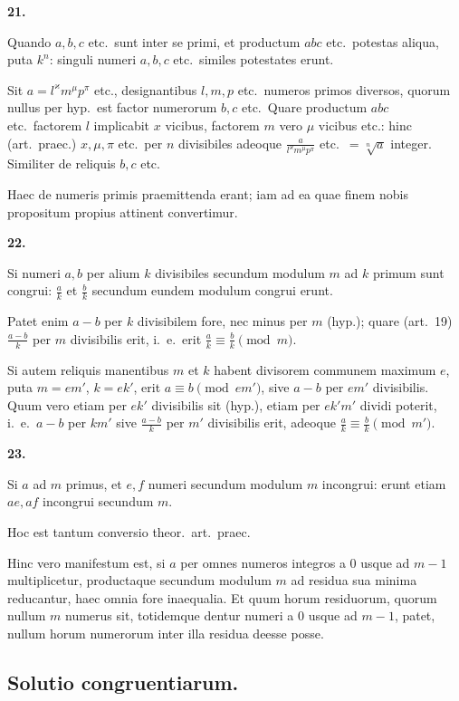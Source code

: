 \documentclass[12pt,a4paper]{article}
\theoremstyle{plain}
\theoremstyle{definition}
\theoremstyle{remark}
\begin{document}
\textbf{21.}

Quando $a, b, c$ etc.\ sunt inter se primi, et productum $abc$ etc.\ potestas aliqua, puta $k^n$: singuli numeri $a, b, c$ etc.\ similes potestates erunt.

Sit $a = l^\varkappa m^\mu p^\pi$ etc., designantibus $l, m, p$ etc.\ numeros primos diversos, quorum nullus per hyp.\ est factor numerorum $b, c$ etc.\ Quare productum $abc$ etc.\ factorem $l$ implicabit $x$ vicibus, factorem $m$ vero $\mu$ vicibus etc.: hinc (art.~praec.) $x, \mu, \pi$ etc.\ per $n$ divisibiles adeoque $\frac{a}{l^\varkappa m^\mu p^\pi}$ etc.\ $= \sqrt[n]{a}$ integer. Similiter de reliquis $b, c$ etc.

Haec de numeris primis praemittenda erant; iam ad ea quae finem nobis propositum propius attinent convertimur.

\textbf{22.}

Si numeri $a, b$ per alium $k$ divisibiles secundum modulum $m$ ad $k$ primum sunt congrui: $\frac{a}{k}$ et $\frac{b}{k}$ secundum eundem modulum congrui erunt.

Patet enim $a - b$ per $k$ divisibilem fore, nec minus per $m$ (hyp.); quare (art.~19) $\frac{a-b}{k}$ per $m$ divisibilis erit, i.~e.\ erit $\frac{a}{k} \equiv \frac{b}{k} \pmod{m}$.

Si autem reliquis manentibus $m$ et $k$ habent divisorem communem maximum $e$, puta $m = em'$, $k = ek'$, erit $a \equiv b \pmod{em'}$, sive $a - b$ per $em'$ divisibilis. Quum vero etiam per $ek'$ divisibilis sit (hyp.), etiam per $ek'm'$ dividi poterit, i.~e.\ $a - b$ per $km'$ sive $\frac{a-b}{k}$ per $m'$ divisibilis erit, adeoque $\frac{a}{k} \equiv \frac{b}{k} \pmod{m'}$.

\textbf{23.}

Si $a$ ad $m$ primus, et $e, f$ numeri secundum modulum $m$ incongrui: erunt etiam $ae, af$ incongrui secundum $m$.

Hoc est tantum conversio theor.\ art.\ praec.

Hinc vero manifestum est, si $a$ per omnes numeros integros a $0$ usque ad $m - 1$ multiplicetur, productaque secundum modulum $m$ ad residua sua minima reducantur, haec omnia fore inaequalia. Et quum horum residuorum, quorum nullum $m$ numerus sit, totidemque dentur numeri a $0$ usque ad $m - 1$, patet, nullum horum numerorum inter illa residua deesse posse.

\vspace{0.5em}
\subsection*{Solutio congruentiarum.}
\end{document}
